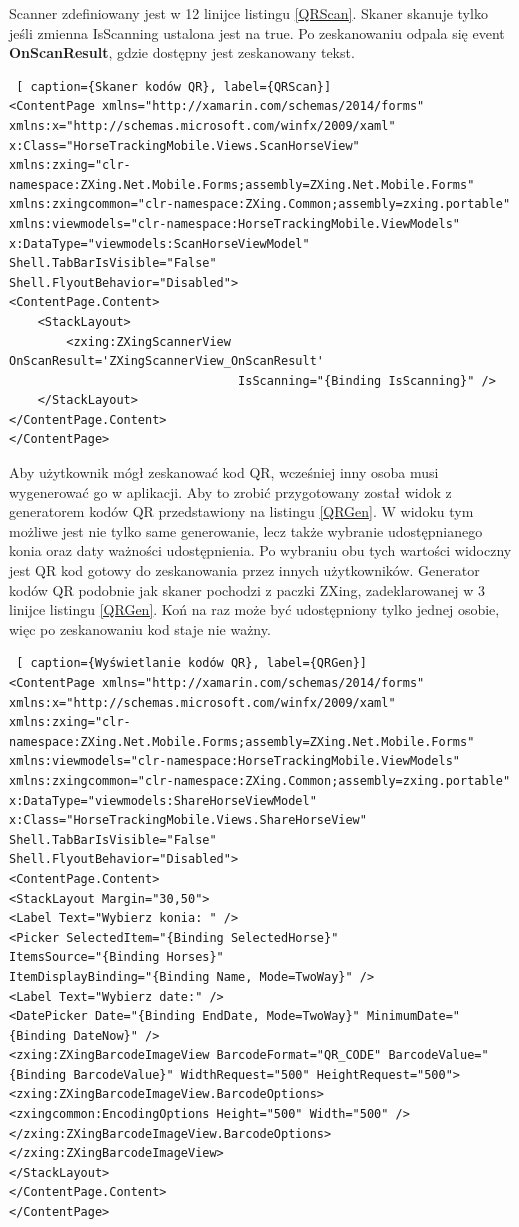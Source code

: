 \documentclass[12pt,oneside]{report}
\begin{document}
Scanner zdefiniowany jest w 12 linijce listingu \ref{QRScan}. Skaner skanuje tylko jeśli zmienna IsScanning ustalona jest na true. Po zeskanowaniu odpala się event \textbf{OnScanResult}, gdzie dostępny jest zeskanowany tekst. \\
\begin{lstlisting} [ caption={Skaner kodów QR}, label={QRScan}]	
<ContentPage xmlns="http://xamarin.com/schemas/2014/forms"
xmlns:x="http://schemas.microsoft.com/winfx/2009/xaml"
x:Class="HorseTrackingMobile.Views.ScanHorseView"
xmlns:zxing="clr-namespace:ZXing.Net.Mobile.Forms;assembly=ZXing.Net.Mobile.Forms"
xmlns:zxingcommon="clr-namespace:ZXing.Common;assembly=zxing.portable"
xmlns:viewmodels="clr-namespace:HorseTrackingMobile.ViewModels"
x:DataType="viewmodels:ScanHorseViewModel"
Shell.TabBarIsVisible="False"
Shell.FlyoutBehavior="Disabled">
<ContentPage.Content>
	<StackLayout>
		<zxing:ZXingScannerView OnScanResult='ZXingScannerView_OnScanResult'
								IsScanning="{Binding IsScanning}" />
	</StackLayout>
</ContentPage.Content>
</ContentPage>
\end{lstlisting}
Aby użytkownik mógł zeskanować kod QR, wcześniej inny osoba musi wygenerować go w aplikacji. Aby to zrobić przygotowany został widok z generatorem kodów QR przedstawiony na listingu \ref{QRGen}. W widoku tym możliwe jest nie tylko same generowanie, lecz także wybranie udostępnianego konia oraz daty ważności udostępnienia. Po wybraniu obu tych wartości widoczny jest QR kod gotowy do zeskanowania przez innych użytkowników. Generator kodów QR podobnie jak skaner pochodzi z paczki ZXing, zadeklarowanej w 3 linijce listingu \ref{QRGen}. Koń na raz może być udostępniony tylko jednej osobie, więc po zeskanowaniu kod staje nie ważny. \\
\begin{lstlisting} [ caption={Wyświetlanie kodów QR}, label={QRGen}]	
<ContentPage xmlns="http://xamarin.com/schemas/2014/forms"
xmlns:x="http://schemas.microsoft.com/winfx/2009/xaml"
xmlns:zxing="clr-namespace:ZXing.Net.Mobile.Forms;assembly=ZXing.Net.Mobile.Forms"
xmlns:viewmodels="clr-namespace:HorseTrackingMobile.ViewModels"
xmlns:zxingcommon="clr-namespace:ZXing.Common;assembly=zxing.portable"
x:DataType="viewmodels:ShareHorseViewModel"
x:Class="HorseTrackingMobile.Views.ShareHorseView"
Shell.TabBarIsVisible="False"
Shell.FlyoutBehavior="Disabled">
<ContentPage.Content>
<StackLayout Margin="30,50">
<Label Text="Wybierz konia: " />
<Picker SelectedItem="{Binding SelectedHorse}"
ItemsSource="{Binding Horses}"
ItemDisplayBinding="{Binding Name, Mode=TwoWay}" />
<Label Text="Wybierz date:" />
<DatePicker Date="{Binding EndDate, Mode=TwoWay}" MinimumDate="{Binding DateNow}" />
<zxing:ZXingBarcodeImageView BarcodeFormat="QR_CODE" BarcodeValue="{Binding BarcodeValue}" WidthRequest="500" HeightRequest="500">
<zxing:ZXingBarcodeImageView.BarcodeOptions>
<zxingcommon:EncodingOptions Height="500" Width="500" />
</zxing:ZXingBarcodeImageView.BarcodeOptions>
</zxing:ZXingBarcodeImageView>
</StackLayout>
</ContentPage.Content>
</ContentPage>
\end{lstlisting}
\end{document}
